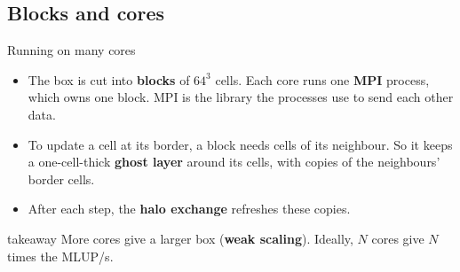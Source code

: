 \documentclass[aspectratio=169,10pt,t]{beamer}
\newcommand{\term}[1]{\textcolor{psblue!85!black}{\textbf{#1}}} %
\newcommand{\takeaway}[1]{\par\vfill
  \begin{beamercolorbox}[wd=\textwidth,sep=4pt,rounded=true]{takeaway}
    \small #1
  \end{beamercolorbox}}
\begin{document}
\subsection{Blocks and cores}
\begin{frame}{Running on many cores}
  \vspace{1mm}
  \centering

  \vspace{0mm}
  \raggedright
  \begin{itemize}\small
    \item The box is cut into \term{blocks} of $64^3$ cells. Each core runs one \term{MPI} process, which owns one
          block. MPI is the library the processes use to send each other data.
    \item To update a cell at its border, a block needs cells of its neighbour. So it keeps a one-cell-thick
          \term{ghost layer} around its cells, with copies of the neighbours' border cells.
    \item After each step, the \term{halo exchange} refreshes these copies.
  \end{itemize}
  \takeaway{More cores give a larger box (\term{weak scaling}). Ideally, $N$ cores give $N$ times the MLUP/s.}
\end{frame}
\end{document}
